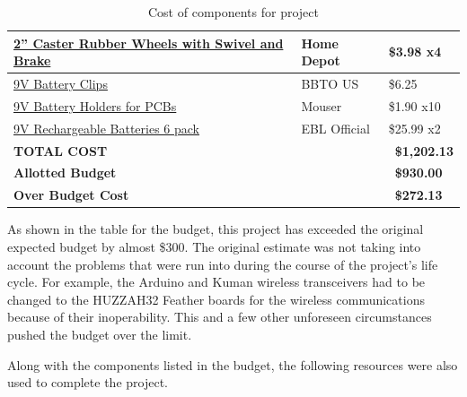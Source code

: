 \begin{table} [H]
\begin{tabular}{|l|l|l|}
		\hline
		\href{https://www.homedepot.com/}{2'' Caster Rubber Wheels with Swivel and Brake} 	& Home Depot 		& \$3.98 x4 \\
		\hline
		\href{https://www.amazon.com/gp/product/B0779ZSNS3/ref=ppx_yo_dt_b_asin_title_o01_s00?ie=UTF8\&psc=1}{9V Battery Clips} 	& BBTO US 		& \$6.25 \\
		\hline
		\href{https://www.mouser.com/ProductDetail/Keystone-Electronics/1294?qs=sGAEpiMZZMsb53hqUvtGaal96fsGiPnZeBRTs87TntQ\%3D}{9V Battery Holders for PCBs} 	& Mouser 		& \$1.90 x10 \\
		\hline
		\href{https://www.amazon.com/gp/product/B00GLK1BO2/ref=ppx_yo_dt_b_asin_title_o01_s01?ie=UTF8\&th=1}{9V Rechargeable Batteries 6 pack} 	& EBL Official 		& \$25.99 x2 \\
		\hline

		\hline
				\textbf{TOTAL COST} & & \ \textbf{\$1,202.13} \\
				\hline
				\textbf{Allotted Budget} & & \ \textbf{\$930.00} \\
				\hline
				\textbf{Over Budget Cost} & & \ \textbf{\$272.13} \\
		\hline 
	\end{tabular} 
	\caption{Cost of components for project}
	\label{table:1}
\end{table}	

As shown in the table for the budget, this project has exceeded the original expected budget by almost \$300. The original estimate was not taking into account the problems that were run into during the course of the project's life cycle. For example, the Arduino and Kuman wireless transceivers had to be changed to the HUZZAH32 Feather boards for the wireless communications because of their inoperability. This and a few other unforeseen circumstances pushed the budget over the limit.\par

\setlength{\parindent}{2.5ex}Along with the components listed in the budget, the following resources were also used to complete the project.

